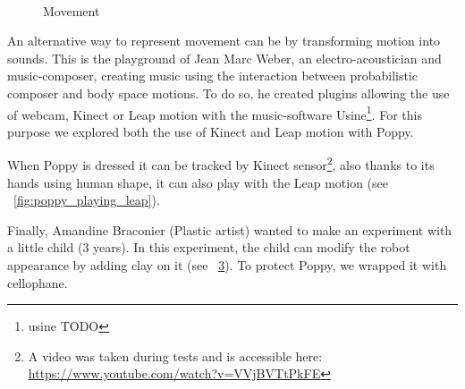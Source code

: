 \begin{figure}[tb]
\centering
    \hfil
    \\
    \hfil
    \caption{Movement }
    \label{fig:residency_canvas}
\end{figure}

An alternative way to represent movement can be by transforming motion into sounds. This is the playground of Jean Marc Weber, an electro-acoustician and music-composer, creating music using the interaction between probabilistic composer and body space motions. To do so, he created plugins allowing the use of webcam, Kinect or Leap motion with the music-software Usine\footnote{usine TODO}. For this purpose we explored both the use of Kinect and Leap motion with Poppy.

When Poppy is dressed it can be tracked by Kinect sensor\footnote{A video was taken during tests and is accessible here: \url{https://www.youtube.com/watch?v=VVjBVTtPkFE}}, also thanks to its hands using human shape, it can also play with the Leap motion (see \figurename~\ref{fig:poppy_playing_leap}).

\begin{figure}[tb]
\centering
    \hfil
    \caption{}
    \label{fig:}
\end{figure}

Finally, Amandine Braconier (Plastic artist) wanted to make an experiment with a little child (3 years). In this experiment, the child can modify the robot appearance by adding clay on it (see \figurename~\ref{fig:clay_on_poppy}). To protect Poppy, we wrapped it with cellophane.

\begin{figure}[tb]
\centering
    \hfil
    \caption{}
    \label{fig:clay_on_poppy}
\end{figure}

